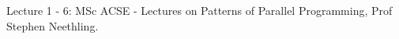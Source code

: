 \documentclass[twoside,twocolumn]{article}
\begin{document}
\begin{thebibliography}{99} 
\bibitem[1]{}Lecture 1 - 6: MSc ACSE - Lectures on Patterns of Parallel Programming, Prof Stephen Neethling.

 
\end{thebibliography}

\end{document}
